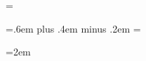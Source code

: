 
\makeatletter\@clubpenalty=\clubpenalty\makeatother %

\spaceskip=.6em plus .4em minus .2em
\xspaceskip=\spaceskip


\emergencystretch=2em


\let\origEmph\emph
\renewcommand{\emph}[1]{\origEmph{#1\/}}

\makeatletter
\newcommand{\fnmarksep}{0.15em}
\renewcommand{\@makefnmark}{\hbox{\textsuperscript{\normalfont\@thefnmark}\kern\fnmarksep}}

\renewcommand{\@makefntext}[1]{%
  \parindent 1em%
  \noindent
  \hb@xt@1.8em{\hss\textsuperscript{\normalfont\@thefnmark}}\kern0.3em #1%
}
\makeatother


\makeatletter
{}
\makeatother


